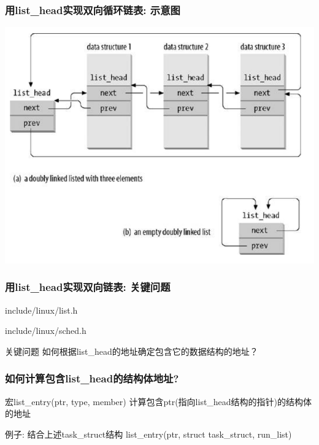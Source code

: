 \documentclass[xcolor=svgnames]{beamer}
\begin{document}
\begin{CJK*}{UTF8}{gbsn}

\begin{frame}[fragile]
\frametitle{用list\_head实现双向循环链表: 示意图}
\includegraphics[width=1.0\textwidth]{listhead.png}
\end{frame}

\begin{frame}[fragile]
\frametitle{用list\_head实现双向链表: 关键问题}
\begin{block}{include/linux/list.h}
\lstlisthead
\end{block}
\begin{block}{include/linux/sched.h}
\lstlistheadusage
\end{block}
\begin{block}{关键问题}
如何根据list\_head的地址确定包含它的数据结构的地址？
\end{block}
\end{frame}

\begin{frame}[fragile]
\frametitle{如何计算包含list\_head的结构体地址?}
\begin{block}{宏list\_entry(ptr, type, member)}
计算包含ptr(指向list\_head结构的指针)的结构体的地址
\end{block}
\begin{block}{例子: 结合上述task\_struct结构}
list\_entry(ptr, struct task\_struct, run\_list)
\end{block}


\end{frame}
\end{CJK*}
\end{document}
